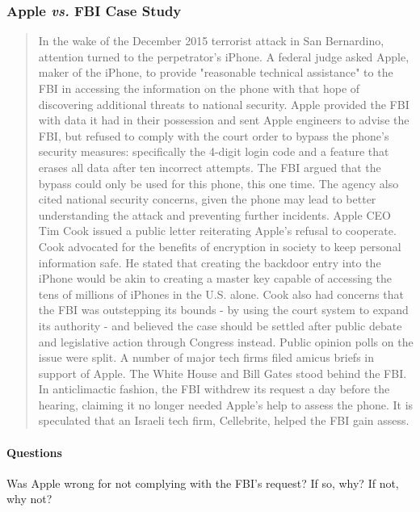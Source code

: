 \subsubsection{Apple \textit{vs.} FBI Case Study \cite{2_af}}
\label{sec:apple}

\begin{quote}
  In the wake of the December 2015 terrorist attack in San Bernardino, attention turned to the perpetrator's iPhone. A federal judge asked Apple, maker of the iPhone, to provide "reasonable technical assistance" to the FBI in accessing the information on the phone with that hope of discovering additional threats to national security. Apple provided the FBI with data it had in their possession and sent Apple engineers to advise the FBI, but refused to comply with the court order to bypass the phone's security measures: specifically the 4-digit login code and a feature that erases all data after ten incorrect attempts. The FBI argued that the bypass could only be used for this phone, this one time. The agency also cited national security concerns, given the phone may lead to better understanding the attack and preventing further incidents. Apple CEO Tim Cook issued a public letter reiterating Apple's refusal to cooperate. Cook advocated for the benefits of encryption in society to keep personal information safe. He stated that creating the backdoor entry into the iPhone would be akin to creating a master key capable of accessing the tens of millions of iPhones in the U.S. alone. Cook also had concerns that the FBI was outstepping its bounds - by using the court system to expand its authority - and believed the case should be settled after public debate and legislative action through Congress instead. Public opinion polls on the issue were split. A number of major tech firms filed amicus briefs in support of Apple. The White House and Bill Gates stood behind the FBI. In anticlimactic fashion, the FBI withdrew its request a day before the hearing, claiming it no longer needed Apple's help to assess the phone. It is speculated that an Israeli tech firm, Cellebrite, helped the FBI gain assess.
\end{quote}

\paragraph{Questions}{
  Was Apple wrong for not complying with the FBI's request? If so, why? If not, why not?
}

